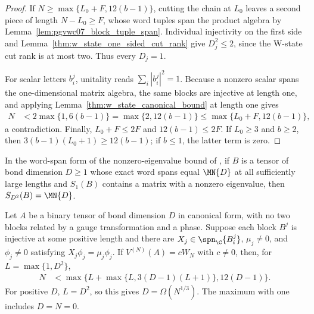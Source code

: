 \begin{proof}
    \leanok
    If $N\ge\max\{L_0+F,12(b-1)\}$, cutting the chain at $L_0$ leaves a second
    piece of length $N-L_0\ge F$, whose word tuples span the product algebra
    by Lemma~\ref{lem:pgvwc07_block_tuple_span}.
    Individual injectivity on the first side and
    Lemma~\ref{thm:w_state_one_sided_cut_rank} give $D_j^2\le2$, since
    the W-state cut rank is at most two. Thus every $D_j=1$.

    For scalar letters $b_i^j$, unitality reads $\sum_i|b_i^j|^2=1$. Because a
    nonzero scalar spans the one-dimensional matrix algebra, the same blocks
    are injective at length one, and applying
    Lemma~\ref{thm:w_state_canonical_bound} at length one gives
    \begin{align}
        N & <2\max\{1,6(b-1)\}
        =\max\{2,12(b-1)\}
        \le\max\{L_0+F,12(b-1)\},
    \end{align}
    a contradiction. Finally, $L_0+F\le2F$ and $12(b-1)\le2F$.
    If $L_0\ge3$ and $b\ge2$, then $3(b-1)(L_0+1)\ge12(b-1)$;
    if $b\le1$, the latter term is zero.
\end{proof}

\begin{lemma}%
    \label{lem:w_state_nonzero_eigenvalue_word_span}
    \leanok
    In the word-span form of the nonzero-eigenvalue bound of
    \cite[Theorem~6.9(3)]{Wolf2012Quantum}, if $B$ is a tensor of bond
    dimension $D\ge1$ whose exact word spans equal $\MN{D}$ at all
    sufficiently large lengths and $S_1(B)$ contains a matrix with a nonzero
    eigenvalue, then $S_{D^2}(B)=\MN{D}$.
\end{lemma}

\begin{lemma}%
    \label{thm:w_state_nonzero_eigenvalue_bound}
    \leanok
    Let $A$ be a binary tensor of bond dimension $D$ in canonical form, with
    no two blocks related by a gauge transformation and a phase. Suppose each
    block $B^j$ is injective at some positive length and there are
    $X_j\in\spn_{\C}\{B_i^j\}$, $\mu_j\ne0$, and $\phi_j\ne0$ satisfying
    $X_j\phi_j=\mu_j\phi_j$. If $V^{(N)}(A)=cW_N$ with $c\ne0$, then,
    for $L=\max\{1,D^2\}$,
    \begin{align}
        N & <\max\bigl\{L+\max\{L,3(D-1)(L+1)\},12(D-1)\bigr\}.
        \label{eq:w_state_cubic_eigenvalue}
    \end{align}
    For positive $D$, $L=D^2$, so this gives $D=\Omega(N^{1/3})$.
    The maximum with one includes $D=N=0$.
\end{lemma}

